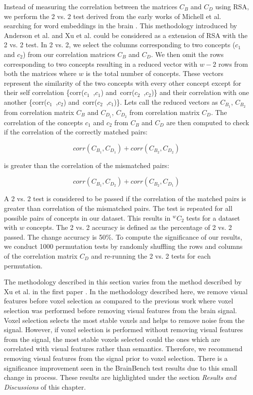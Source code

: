 Instead of measuring the correlation between the matrices $C_B$ and  $C_D$ using RSA, we perform the 2 vs. 2 test derived from the early works of Michell et al. searching for word embeddings in the brain \cite{Mitchell1191}. This methodology introduced by  Anderson et al. \cite{Andrew2vs2} and Xu et al. \cite{BrainBench2016} could be considered as a extension of RSA with the 2 vs. 2 test. In 2 vs. 2, we select the columns corresponding to two concepts ($c_1$ and $c_2$) from our correlation matrices $C_B$ and  $C_D$. We then omit the rows corresponding to two concepts resulting in a reduced vector with $w-2$ rows from both the matrices where $w$ is the total number of concepts. These vectors represent the similarity of the two concepts with every other concept except for their self correlation \{corr($c_1$~,$c_1$) and~corr($c_2$~,$c_2$)\} and their correlation with one another \{corr($c_1$~,$c_2$) and~corr($c_2$~,$c_1$)\}. Lets call the reduced vectors as
$C_{B_1}$, $C_{B_2}$ from correlation matrix $C_B$ and $C_{D_1}$, $C_{D_2}$ from correlation matrix $C_D$. The correlation of the concepts $c_1$ and $c_2$ from $C_B$ and  $C_D$  are then computed to check if the correlation of the correctly matched pairs:

\[corr(C_{B_1},C_{D_1}) + corr(C_{B_2},C_{D_2})  \]

\noindent is greater than the correlation of the mismatched pairs:

\[corr(C_{B_1},C_{D_2}) + corr(C_{B_2},C_{D_1})  \]

A 2 vs. 2 test is considered to be passed if the correlation of the matched pairs is greater than correlation of the mismatched pairs. The test is repeated for all possible pairs of concepts in our dataset. This results in $^wC_2$ tests for a dataset with $w$ concepts. The 2 vs. 2 accuracy is defined as the percentage of 2 vs. 2 passed. The change accuracy is 50\%. To compute the significance of our results, we conduct 1000 permutation tests by randomly shuffling the rows and columns of the correlation matrix $C_D$ and re-running the 2 vs. 2 tests for each permutation.

The methodology described in this section varies from the method described by Xu et al. in the first paper \cite{BrainBench2016}. In the methodology described here, we remove visual features before voxel selection as compared to the previous work where voxel selection was performed before removing visual features from the brain signal. Voxel selection selects the most stable voxels and helps to remove noise from the signal. However, if voxel selection is performed without removing visual features from the signal, the most stable voxels selected could the ones which are correlated with visual features rather than semantics. Therefore, we recommend removing visual features from the signal prior to voxel selection. There is a significance improvement seen in the BrainBench test results due to this small change in process. These results are highlighted under the section \textit{Results and Discussions} of this chapter.

